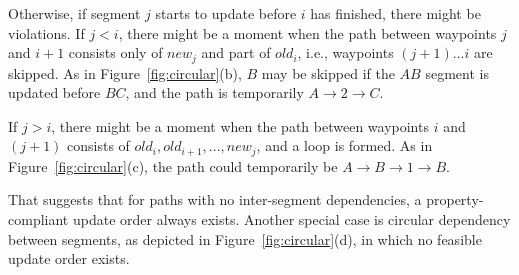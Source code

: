 Otherwise, if segment $j$ starts to update before $i$ has finished, there might be
violations. If $j < i$, there might be a moment when the path between waypoints $j$
and $i+1$ consists only of $new_j$ and part of $old_i$, i.e., waypoints $(j+1)
... i$ are skipped. As in Figure~\ref{fig:circular}(b), $B$ may be skipped
if the $AB$ segment is updated before $BC$, and the path is temporarily $A \rightarrow 2 \rightarrow C$. 

If $j > i$, there might be a moment when the path between waypoints
$i$ and $(j+1)$ consists of $old_i, old_{i+1}, ..., new_j$, and a loop is formed.
As in Figure~\ref{fig:circular}(c), the path could temporarily be $A \rightarrow B \rightarrow 1 \rightarrow B$.

That suggests that for paths with no inter-segment dependencies, 
a property-compliant update order always exists.
Another special case is circular dependency between segments, as depicted in Figure~\ref{fig:circular}(d), 
in which no feasible update order exists.

